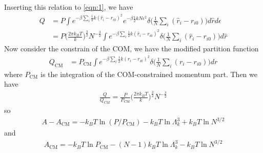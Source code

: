 \documentclass[aps,pre,a4paper,showkeys,fleqn]{revtex4}
\newcommand{\com}[0]{{\textrm{CM}}}
\begin{document}
Inserting this relation to \eqref{eqn:1}, we have
\begin{align}\nonumber
  Q
  & =
    P \int e^{-\beta\sum_i \frac 12k(\hat r_i - r_{i0})^2} e^{-\beta \frac12 kN \epsilon^2} \delta\big( \frac1N \sum_i (\hat r_i - r_{i0}) \big) d\hat r d\epsilon \\
  &=
    P \Big( \frac{2\pi k_BT}k  \Big)^{\frac32} N^{-\frac32}
    \int e^{-\beta\sum_i \frac 12k(\hat r_i - r_{i0})^2} \delta\big( \frac1N \sum_i (\hat r_i - r_{i0}) \big) d\hat r
\end{align}
Now consider the constrain of the COM, we have the modified partition function
\begin{align*}
  Q_\com
  &=
    {P_\com}
    \int e^{-\beta\sum_i \frac 12k(r_i - r_{i0})^2} \delta\big(\frac1N\sum_i (r_i -  r_{i0})\big) dr
\end{align*}
where $P_\com$ is the integration of the COM-constrained momentum part.
Then we have
\begin{align}
  \frac{Q}{Q_\com} = \frac{P}{P_\com}\Big( \frac{2\pi k_BT}k  \Big)^{\frac32} N^{-\frac32}
\end{align}
so
\begin{align}
  A - A_\com = -k_BT \ln(P/P_\com) - k_BT \ln \Lambda_k^3 + k_BT \ln N^{3/2}
\end{align}
and
\begin{align}\label{eqn:5}
  A_\com = -k_BT \ln P_\com - (N-1) k_BT \ln \Lambda_k^3 - k_BT \ln N^{3/2}
\end{align}
\end{document}
